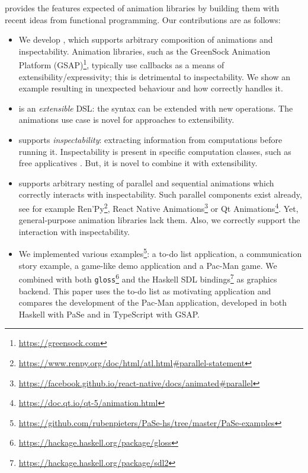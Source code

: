 \dsl{} provides the features expected of animation libraries by building them with recent ideas from functional programming. Our contributions are as follows:
\begin{itemize}
\item We develop \dsl{}, which supports arbitrary composition of animations and inspectability. Animation libraries, such as the GreenSock Animation Platform (GSAP)\footnote{\url{https://greensock.com}}, typically use callbacks as a means of extensibility/expressivity; this is detrimental to inspectability. We show an example resulting in unexpected behaviour and how \dsl{} correctly handles it.
\item \dsl{} is an \emph{extensible} DSL: the syntax can be extended with new operations. The animations use case is novel for approaches to extensibility.
\item \dsl{} supports \emph{inspectability}: extracting information from computations before running it. Inspectability is present in specific computation classes, such as free applicatives \cite{DBLP:journals/corr/CapriottiK14}. But, it is novel to combine it with extensibility.
\item \dsl{} supports arbitrary nesting of parallel and sequential animations which correctly interacts with inspectability. Such parallel components exist already, see for example Ren'Py\footnote{\url{https://www.renpy.org/doc/html/atl.html\#parallel-statement}}, React Native Animations\footnote{\url{https://facebook.github.io/react-native/docs/animated\#parallel}} or Qt Animations\footnote{\url{https://doc.qt.io/qt-5/animation.html}}. Yet, general-purpose animation libraries lack them. Also, we correctly support the interaction with inspectability.
\item We implemented various examples\footnote{\url{https://github.com/rubenpieters/PaSe-hs/tree/master/PaSe-examples}}: a to-do list application, a communication story example, a game-like demo application and a Pac-Man game. We combined \dsl{} with both \texttt{gloss}\footnote{\url{https://hackage.haskell.org/package/gloss}} and the Haskell SDL bindings\footnote{\url{https://hackage.haskell.org/package/sdl2}} as graphics backend. This paper uses the to-do list as motivating application and compares the development of the Pac-Man application, developed in both Haskell with PaSe and in TypeScript with GSAP.
\end{itemize}
